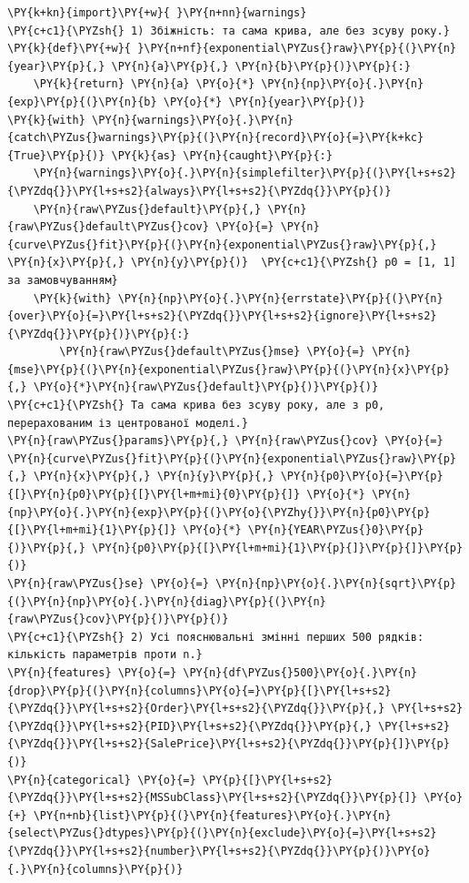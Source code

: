 \begin{Verbatim}[commandchars=\\\{\}]
\PY{k+kn}{import}\PY{+w}{ }\PY{n+nn}{warnings}
\PY{c+c1}{\PYZsh{} 1) Збіжність: та сама крива, але без зсуву року.}
\PY{k}{def}\PY{+w}{ }\PY{n+nf}{exponential\PYZus{}raw}\PY{p}{(}\PY{n}{year}\PY{p}{,} \PY{n}{a}\PY{p}{,} \PY{n}{b}\PY{p}{)}\PY{p}{:}
    \PY{k}{return} \PY{n}{a} \PY{o}{*} \PY{n}{np}\PY{o}{.}\PY{n}{exp}\PY{p}{(}\PY{n}{b} \PY{o}{*} \PY{n}{year}\PY{p}{)}
\PY{k}{with} \PY{n}{warnings}\PY{o}{.}\PY{n}{catch\PYZus{}warnings}\PY{p}{(}\PY{n}{record}\PY{o}{=}\PY{k+kc}{True}\PY{p}{)} \PY{k}{as} \PY{n}{caught}\PY{p}{:}
    \PY{n}{warnings}\PY{o}{.}\PY{n}{simplefilter}\PY{p}{(}\PY{l+s+s2}{\PYZdq{}}\PY{l+s+s2}{always}\PY{l+s+s2}{\PYZdq{}}\PY{p}{)}
    \PY{n}{raw\PYZus{}default}\PY{p}{,} \PY{n}{raw\PYZus{}default\PYZus{}cov} \PY{o}{=} \PY{n}{curve\PYZus{}fit}\PY{p}{(}\PY{n}{exponential\PYZus{}raw}\PY{p}{,} \PY{n}{x}\PY{p}{,} \PY{n}{y}\PY{p}{)}  \PY{c+c1}{\PYZsh{} p0 = [1, 1] за замовчуванням}
    \PY{k}{with} \PY{n}{np}\PY{o}{.}\PY{n}{errstate}\PY{p}{(}\PY{n}{over}\PY{o}{=}\PY{l+s+s2}{\PYZdq{}}\PY{l+s+s2}{ignore}\PY{l+s+s2}{\PYZdq{}}\PY{p}{)}\PY{p}{:}
        \PY{n}{raw\PYZus{}default\PYZus{}mse} \PY{o}{=} \PY{n}{mse}\PY{p}{(}\PY{n}{exponential\PYZus{}raw}\PY{p}{(}\PY{n}{x}\PY{p}{,} \PY{o}{*}\PY{n}{raw\PYZus{}default}\PY{p}{)}\PY{p}{)}
\PY{c+c1}{\PYZsh{} Та сама крива без зсуву року, але з p0, перерахованим із центрованої моделі.}
\PY{n}{raw\PYZus{}params}\PY{p}{,} \PY{n}{raw\PYZus{}cov} \PY{o}{=} \PY{n}{curve\PYZus{}fit}\PY{p}{(}\PY{n}{exponential\PYZus{}raw}\PY{p}{,} \PY{n}{x}\PY{p}{,} \PY{n}{y}\PY{p}{,} \PY{n}{p0}\PY{o}{=}\PY{p}{[}\PY{n}{p0}\PY{p}{[}\PY{l+m+mi}{0}\PY{p}{]} \PY{o}{*} \PY{n}{np}\PY{o}{.}\PY{n}{exp}\PY{p}{(}\PY{o}{\PYZhy{}}\PY{n}{p0}\PY{p}{[}\PY{l+m+mi}{1}\PY{p}{]} \PY{o}{*} \PY{n}{YEAR\PYZus{}0}\PY{p}{)}\PY{p}{,} \PY{n}{p0}\PY{p}{[}\PY{l+m+mi}{1}\PY{p}{]}\PY{p}{]}\PY{p}{)}
\PY{n}{raw\PYZus{}se} \PY{o}{=} \PY{n}{np}\PY{o}{.}\PY{n}{sqrt}\PY{p}{(}\PY{n}{np}\PY{o}{.}\PY{n}{diag}\PY{p}{(}\PY{n}{raw\PYZus{}cov}\PY{p}{)}\PY{p}{)}
\PY{c+c1}{\PYZsh{} 2) Усі пояснювальні змінні перших 500 рядків: кількість параметрів проти n.}
\PY{n}{features} \PY{o}{=} \PY{n}{df\PYZus{}500}\PY{o}{.}\PY{n}{drop}\PY{p}{(}\PY{n}{columns}\PY{o}{=}\PY{p}{[}\PY{l+s+s2}{\PYZdq{}}\PY{l+s+s2}{Order}\PY{l+s+s2}{\PYZdq{}}\PY{p}{,} \PY{l+s+s2}{\PYZdq{}}\PY{l+s+s2}{PID}\PY{l+s+s2}{\PYZdq{}}\PY{p}{,} \PY{l+s+s2}{\PYZdq{}}\PY{l+s+s2}{SalePrice}\PY{l+s+s2}{\PYZdq{}}\PY{p}{]}\PY{p}{)}
\PY{n}{categorical} \PY{o}{=} \PY{p}{[}\PY{l+s+s2}{\PYZdq{}}\PY{l+s+s2}{MSSubClass}\PY{l+s+s2}{\PYZdq{}}\PY{p}{]} \PY{o}{+} \PY{n+nb}{list}\PY{p}{(}\PY{n}{features}\PY{o}{.}\PY{n}{select\PYZus{}dtypes}\PY{p}{(}\PY{n}{exclude}\PY{o}{=}\PY{l+s+s2}{\PYZdq{}}\PY{l+s+s2}{number}\PY{l+s+s2}{\PYZdq{}}\PY{p}{)}\PY{o}{.}\PY{n}{columns}\PY{p}{)}

\end{Verbatim}
